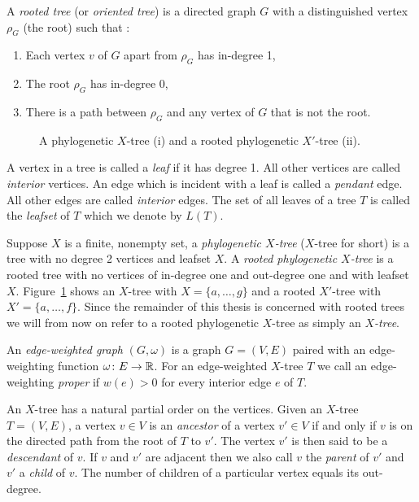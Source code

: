 A \textit{rooted tree} (or \textit{oriented tree}) is a directed graph $G$
with a distinguished vertex $\rho_G$ (the root) such that
\cite{knuth97taocp1}:
\begin{enumerate}[label=\alph*)]
\item Each vertex $v$ of $G$ apart from $\rho_G$ has in-degree 1,
\item The root $\rho_G$ has in-degree 0,
\item There is a path between $\rho_G$ and any vertex of $G$ that is not the
  root.
\end{enumerate}

\begin{figure}
  \centering
  
  \caption{A phylogenetic $X$-tree (i) and a rooted phylogenetic $X'$-tree
    (ii).}
  \label{fig:x-tree-ex}
\end{figure}

A vertex in a tree is called a \textit{leaf} if it has degree 1.  All other
vertices are called \textit{interior} vertices.  An edge which is incident
with a leaf is called a \textit{pendant} edge.  All other edges are called
\textit{interior} edges.  The set of all leaves of a tree $T$ is called the
\textit{leafset} of $T$ which we denote by $L(T)$.

Suppose $X$ is a finite, nonempty set, a \textit{phylogenetic $X$-tree}
($X$-tree for short) is a tree with no degree 2 vertices and leafset $X$.  A
\textit{rooted phylogenetic $X$-tree} is a rooted tree with no vertices of
in-degree one and out-degree one and with leafset $X$.
Figure~\ref{fig:x-tree-ex} shows an $X$-tree with $X = \{a,\dotsc,g\}$ and a
rooted $X'$-tree with $X' = \{a,\dotsc,f\}$.  Since the remainder of this
thesis is concerned with rooted trees we will from now on refer to a rooted
phylogenetic $X$-tree as simply an \textit{$X$-tree}.

An \textit{edge-weighted graph} $(G,\omega)$ is a graph $G=(V,E)$ paired with
an edge-weighting function $\omega \colon E \to {\mathbb R}$.  For an edge-weighted
$X$-tree $T$ we call an edge-weighting \textit{proper} if $w(e) > 0$ for every
interior edge $e$ of $T$.

An $X$-tree has a natural partial order on the vertices.  Given an $X$-tree
$T=(V,E)$, a vertex $v \in V$ is an \textit{ancestor} of a vertex $v' \in V$
if and only if $v$ is on the directed path from the root of $T$ to $v'$.  The
vertex $v'$ is then said to be a \textit{descendant} of $v$.  If $v$ and $v'$
are adjacent then we also call $v$ the \textit{parent} of $v'$ and $v'$ a
\textit{child} of $v$.  The number of children of a particular vertex equals
its out-degree.

